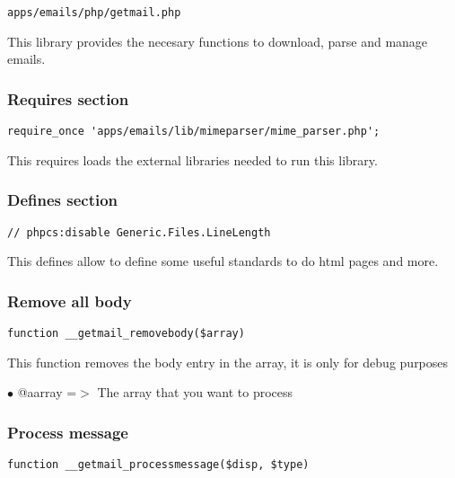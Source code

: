 \documentclass[a4paper]{article}
\begin{document}
\begin{lstlisting}
apps/emails/php/getmail.php
\end{lstlisting}

This library provides the necesary functions to download, parse and manage emails.

\hypertarget{toc69}{}
\subsubsection{Requires section}

\begin{lstlisting}
require_once 'apps/emails/lib/mimeparser/mime_parser.php';
\end{lstlisting}

This requires loads the external libraries needed to run this library.

\hypertarget{toc70}{}
\subsubsection{Defines section}

\begin{lstlisting}
// phpcs:disable Generic.Files.LineLength
\end{lstlisting}

This defines allow to define some useful standards to do html pages and more.

\hypertarget{toc71}{}
\subsubsection{Remove all body}

\begin{lstlisting}
function __getmail_removebody($array)
\end{lstlisting}

This function removes the body entry in the array, it is only for debug purposes

\begin{compactitem}
\item[\color{myblue}$\bullet$] @aarray =$>$ The array that you want to process
\end{compactitem}

\hypertarget{toc72}{}
\subsubsection{Process message}

\begin{lstlisting}
function __getmail_processmessage($disp, $type)
\end{lstlisting}
\end{document}
